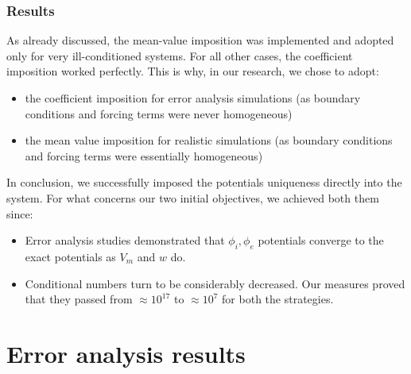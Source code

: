 \documentclass[a4paper,11pt]{article}
\begin{document}
\subsubsection{Results} \label{uniqueness_results}
\noindent As already discussed, the mean-value imposition was implemented and adopted only for very ill-conditioned systems. For all other cases, the coefficient imposition worked perfectly. This is why, in our research, we chose to adopt:
\begin{itemize}
	\item the coefficient imposition for error analysis simulations (as boundary conditions and forcing terms were never homogeneous)
	\item the mean value imposition for realistic simulations (as boundary conditions and forcing terms were essentially homogeneous)
\end{itemize}\vspace{2mm}

\noindent In conclusion, we successfully imposed the potentials uniqueness directly into the system. For what concerns our two initial objectives, we achieved both them since:
\begin{itemize}
	\item Error analysis studies demonstrated that $\phi_i,\phi_e$ potentials converge to the exact potentials as $V_m$ and $w$ do.
	\item Conditional numbers turn to be considerably decreased. Our measures proved that they passed from $\approx 10^{17}$ to $\approx 10^{7}$ for both the strategies.
\end{itemize} 

\vspace{6mm}

\section{Error analysis results}
\end{document}
